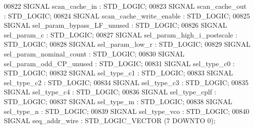 \begin{DoxyCode}
{00822      \textcolor{keywordflow}{SIGNAL}  \textcolor{vhdlchar}{scan_cache_in} \textcolor{vhdlchar}{:}    \textcolor{comment}{STD\_LOGIC};
00823      \textcolor{keywordflow}{SIGNAL}  \textcolor{vhdlchar}{scan_cache_out} \textcolor{vhdlchar}{:}   \textcolor{comment}{STD\_LOGIC};
00824      \textcolor{keywordflow}{SIGNAL}  \textcolor{vhdlchar}{scan_cache_write_enable} \textcolor{vhdlchar}{:}  \textcolor{comment}{STD\_LOGIC};
00825      \textcolor{keywordflow}{SIGNAL}  \textcolor{vhdlchar}{sel_param_bypass_LF_unused} \textcolor{vhdlchar}{:}   \textcolor{comment}{STD\_LOGIC};
00826      \textcolor{keywordflow}{SIGNAL}  \textcolor{vhdlchar}{sel_param_c} \textcolor{vhdlchar}{:}  \textcolor{comment}{STD\_LOGIC};
00827      \textcolor{keywordflow}{SIGNAL}  \textcolor{vhdlchar}{sel_param_high_i_postscale} \textcolor{vhdlchar}{:}   \textcolor{comment}{STD\_LOGIC};
00828      \textcolor{keywordflow}{SIGNAL}  \textcolor{vhdlchar}{sel_param_low_r} \textcolor{vhdlchar}{:}  \textcolor{comment}{STD\_LOGIC};
00829      \textcolor{keywordflow}{SIGNAL}  \textcolor{vhdlchar}{sel_param_nominal_count} \textcolor{vhdlchar}{:}  \textcolor{comment}{STD\_LOGIC};
00830      \textcolor{keywordflow}{SIGNAL}  \textcolor{vhdlchar}{sel_param_odd_CP_unused} \textcolor{vhdlchar}{:}  \textcolor{comment}{STD\_LOGIC};
00831      \textcolor{keywordflow}{SIGNAL}  \textcolor{vhdlchar}{sel_type_c0} \textcolor{vhdlchar}{:}  \textcolor{comment}{STD\_LOGIC};
00832      \textcolor{keywordflow}{SIGNAL}  \textcolor{vhdlchar}{sel_type_c1} \textcolor{vhdlchar}{:}  \textcolor{comment}{STD\_LOGIC};
00833      \textcolor{keywordflow}{SIGNAL}  \textcolor{vhdlchar}{sel_type_c2} \textcolor{vhdlchar}{:}  \textcolor{comment}{STD\_LOGIC};
00834      \textcolor{keywordflow}{SIGNAL}  \textcolor{vhdlchar}{sel_type_c3} \textcolor{vhdlchar}{:}  \textcolor{comment}{STD\_LOGIC};
00835      \textcolor{keywordflow}{SIGNAL}  \textcolor{vhdlchar}{sel_type_c4} \textcolor{vhdlchar}{:}  \textcolor{comment}{STD\_LOGIC};
00836      \textcolor{keywordflow}{SIGNAL}  \textcolor{vhdlchar}{sel_type_cplf} \textcolor{vhdlchar}{:}    \textcolor{comment}{STD\_LOGIC};
00837      \textcolor{keywordflow}{SIGNAL}  \textcolor{vhdlchar}{sel_type_m} \textcolor{vhdlchar}{:}   \textcolor{comment}{STD\_LOGIC};
00838      \textcolor{keywordflow}{SIGNAL}  \textcolor{vhdlchar}{sel_type_n} \textcolor{vhdlchar}{:}   \textcolor{comment}{STD\_LOGIC};
00839      \textcolor{keywordflow}{SIGNAL}  \textcolor{vhdlchar}{sel_type_vco} \textcolor{vhdlchar}{:} \textcolor{comment}{STD\_LOGIC};
00840      \textcolor{keywordflow}{SIGNAL}  \textcolor{vhdlchar}{seq_addr_wire} \textcolor{vhdlchar}{:}    \textcolor{comment}{STD\_LOGIC\_VECTOR} \textcolor{vhdlchar}{(}\textcolor{vhdllogic}{}\textcolor{vhdllogic}{7} \textcolor{keywordflow}{DOWNTO} \textcolor{vhdllogic}{}\textcolor{vhdllogic}{0}\textcolor{vhdlchar}{)};
}
\end{DoxyCode}
